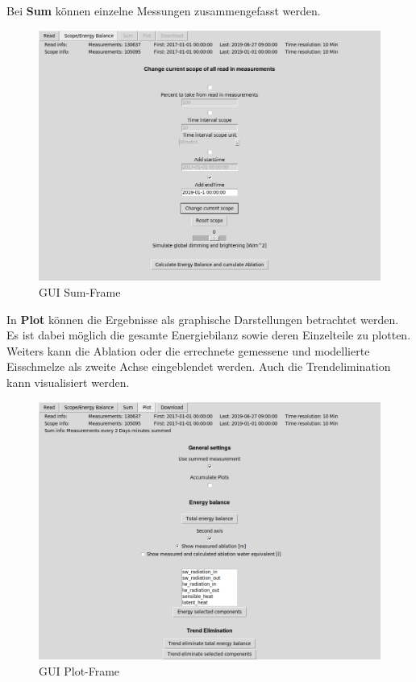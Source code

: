 \documentclass[12pt,a4paper]{article}
\begin{document}
Bei \textbf{Sum} können einzelne Messungen zusammengefasst werden.

\begin{figure}[H]
\centering
\includegraphics[width=1\textwidth]{pictures/GUI/Scope_Energy_Balance_Frame.png}
\caption{GUI Sum-Frame}
\label{fig:GUI Sum-Frame}
\end{figure}

In \textbf{Plot} können die Ergebnisse als graphische Darstellungen betrachtet werden. Es ist dabei möglich die gesamte Energiebilanz sowie deren Einzelteile zu plotten. Weiters kann die Ablation oder die errechnete gemessene und modellierte Eisschmelze als zweite Achse eingeblendet werden. Auch die Trendelimination kann visualisiert werden.

\begin{figure}[H]
\centering
\includegraphics[width=1\textwidth]{pictures/GUI/Plot_Frame.png}
\caption{GUI Plot-Frame}
\label{fig:GUI Plot-Frame}
\end{figure}
\end{document}
